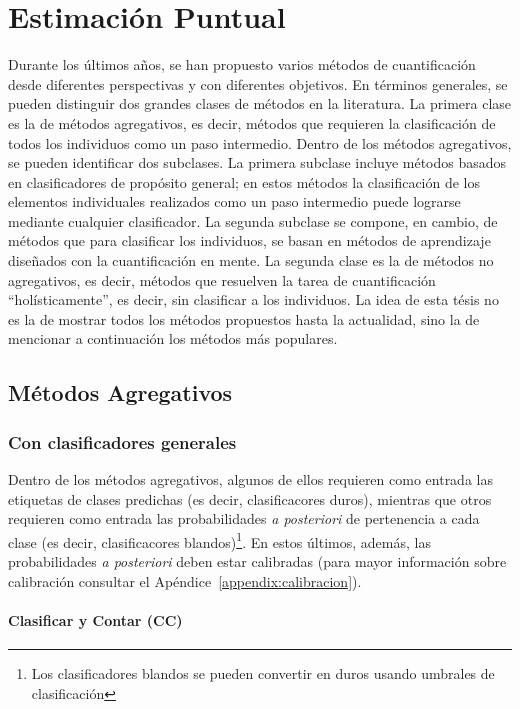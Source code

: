 \chapter{Estimación Puntual}\label{puntual}

Durante los últimos años, se han propuesto varios métodos de cuantificación
desde diferentes perspectivas y con diferentes objetivos. En términos generales,
se pueden distinguir dos grandes clases de métodos en la literatura. La primera
clase es la de métodos agregativos, es decir, métodos que requieren la
clasificación de todos los individuos como un paso intermedio. Dentro de los
métodos agregativos, se pueden identificar dos subclases. La primera subclase
incluye métodos basados en clasificadores de propósito general; en estos métodos
la clasificación de los elementos individuales realizados como un paso
intermedio puede lograrse mediante cualquier clasificador. La segunda subclase
se compone, en cambio, de métodos que para clasificar los individuos, se basan
en métodos de aprendizaje diseñados con la cuantificación en mente. La segunda
clase es la de métodos no agregativos, es decir, métodos que resuelven la tarea
de cuantificación “holísticamente”, es decir, sin clasificar a los individuos.
La idea de esta tésis no es la de mostrar todos los métodos propuestos hasta la
actualidad, sino la de mencionar a continuación los métodos más populares.

\section{Métodos Agregativos}\label{puntual:agregativos}

\subsection{Con clasificadores generales}

Dentro de los métodos agregativos, algunos de ellos requieren como entrada las
etiquetas de clases predichas (es decir, clasificacores duros), mientras que
otros requieren como entrada las probabilidades {\it a posteriori\/} de
pertenencia a cada clase (es decir, clasificacores blandos)\footnote{Los
clasificadores blandos se pueden convertir en duros usando umbrales de
clasificación}. En estos últimos, además, las probabilidades {\it a
posteriori\/} deben estar calibradas (para mayor información sobre calibración
consultar el Apéndice~\ref{appendix:calibracion}).

\subsubsection{Clasificar y Contar (CC)}

